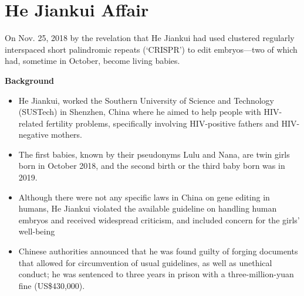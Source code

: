 \documentclass[plain,basic]{inVerba-notes}
\begin{document}
    \section{He Jiankui Affair}

    On Nov. 25, 2018 by the revelation that He Jiankui had used clustered regularly interspaced short palindromic repeats (‘CRISPR’) to edit embryos—two of which had, sometime in October, become living babies.

    \textbf{\large Background}
    \begin{itemize}
        \item He Jiankui, worked the Southern University of Science and Technology (SUSTech) in Shenzhen, China where he aimed to help people with HIV-related fertility problems, specifically involving HIV-positive fathers and HIV-negative mothers.
        \item The first babies, known by their pseudonyms Lulu and Nana, are twin girls born in October 2018, and the second birth or the third baby born was in 2019.
        \item Although there were not any specific laws in China on gene editing in humans, He Jiankui violated the available guideline on handling human embryos and received widespread criticism, and included concern for the girls' well-being
        \item Chinese authorities announced that he was found guilty of forging documents that allowed for circumvention of usual guidelines, as well as unethical conduct; he was sentenced to three years in prison with a three-million-yuan fine (US\$430,000).
    \end{itemize}
    \vspace{4pt}
    
\end{document}
